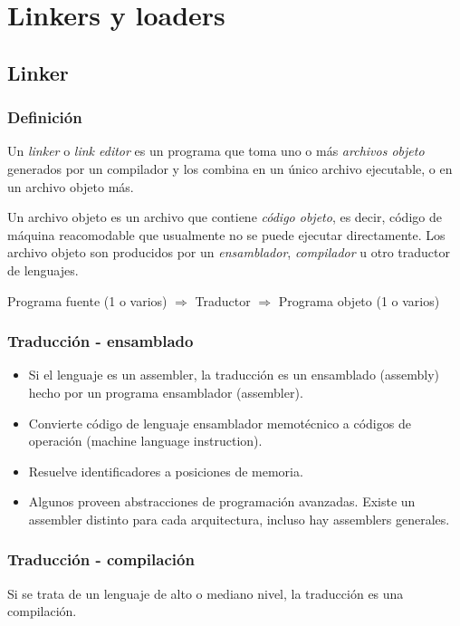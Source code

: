 \documentclass[a4paper, twoside]{article}
\begin{document}
\newpage
\section{Linkers y loaders}
\subsection{Linker}
\subsubsection{Definición}
Un \emph{linker} o \emph{link editor} es un programa que toma uno o más \emph{archivos objeto} generados por un compilador y los combina en un único archivo ejecutable, o en un archivo objeto más.

Un archivo objeto es un archivo que contiene \emph{código objeto}, es decir, código de máquina reacomodable que usualmente no se puede ejecutar directamente. Los archivo objeto son producidos por un \emph{ensamblador}, \emph{compilador} u otro traductor de lenguajes.

\begin{center}
	Programa fuente (1 o varios) $\Rightarrow$ Traductor $\Rightarrow$ Programa objeto (1 o varios)
\end{center}

\subsubsection{Traducción - ensamblado}
\begin{itemize}
	\item Si el lenguaje es un assembler, la traducción es un ensamblado (assembly) hecho por un programa ensamblador (assembler).
	\item Convierte código de lenguaje ensamblador memotécnico a códigos de operación (machine language instruction).
	\item Resuelve identificadores a posiciones de memoria.
	\item Algunos proveen abstracciones de programación avanzadas.
Existe un assembler distinto para cada arquitectura, incluso hay assemblers generales.
\end{itemize}

\subsubsection{Traducción - compilación}
Si se trata de un lenguaje de alto o mediano nivel, la traducción es una compilación.
\end{document}
